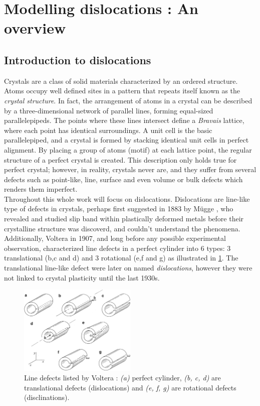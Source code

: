 \documentclass{article}
\begin{document}
\section{Modelling dislocations : An overview}
\subsection{Introduction to dislocations}
Crystals are a class of solid materials characterized by an ordered structure. Atoms occupy well defined sites in a pattern that repeats itself known as the \emph{crystal structure}. In fact, the arrangement of atoms in a crystal can be described by a three-dimensional network of parallel lines, forming equal-sized parallelepipeds. The points where these lines intersect define a \emph{Bravais} lattice, where each point has identical surroundings. A unit cell is the basic parallelepiped, and a crystal is formed by stacking identical unit cells in perfect alignment. By placing a group of atoms (motif) at each lattice point, the regular structure of a perfect crystal is created. This description only holds true for perfect crystal; however, in reality, crystals never are, and they suffer from several defects such as point-like, line, surface and even volume or bulk defects which renders them imperfect.\\ 
Throughout this whole work will focus on dislocations. Dislocations are line-like type of defects in crystals, perhaps first suggested in 1883 by Mügge \parencite{muggeNeuesJahrbuch1883}, who revealed and studied slip band within plastically deformed metals before their crystalline structure was discoverd, and couldn't understand the phenomena. Additionally, Voltera \parencite{voltera1907} in 1907, and long before any possible experimental observation, characterized line defects in a perfect cylinder into 6 types: 3 translational (b,c and d) and 3 rotational (e,f and g) as illustrated in \cref{fig:voltera6}. The translational line-like defect were later on named \emph{dislocations}, however they were not linked to crystal plasticity until the last 1930s.
\begin{figure}[H]
    \centering
        \includegraphics[width=0.5\textwidth]{imgs/fdm/voltera6.png}
        \caption{Line defects listed by Voltera \parencite{voltera1907}:  \emph{(a)} perfect cylinder, \emph{(b, c, d)} are translational defects (dislocations) and \emph{(e, f, g)} are rotational defects (disclinations).}\label{fig:voltera6}
\end{figure}
\end{document}
